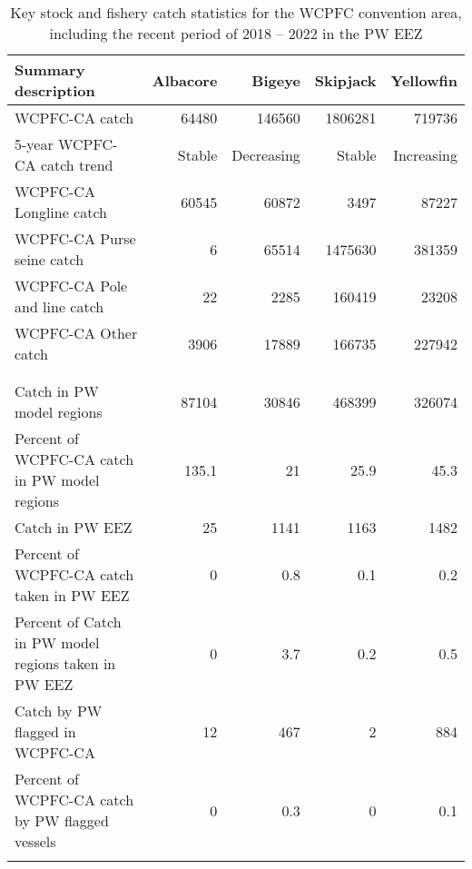 \begin{longtable}{lrrrr}
\caption{Key stock and fishery catch statistics for the WCPFC convention area, including the recent period of 2018 -- 2022 in the PW EEZ} \\ 
  \hline
Summary description & Albacore & Bigeye & Skipjack & Yellowfin \\ 
  \hline
WCPFC-CA catch & 64480 & 146560 & 1806281 & 719736 \\ 
  5-year WCPFC-CA catch trend & Stable & Decreasing & Stable & Increasing \\ 
  WCPFC-CA Longline catch & 60545 & 60872 & 3497 & 87227 \\ 
  WCPFC-CA Purse seine catch & 6 & 65514 & 1475630 & 381359 \\ 
  WCPFC-CA Pole and line catch & 22 & 2285 & 160419 & 23208 \\ 
  WCPFC-CA Other catch & 3906 & 17889 & 166735 & 227942 \\ 
   &  &  &  &  \\ 
   &  &  &  &  \\ 
   \hline
Catch in PW model regions & 87104 & 30846 & 468399 & 326074 \\ 
  Percent of WCPFC-CA catch in PW model regions & 135.1 & 21 & 25.9 & 45.3 \\ 
  Catch in PW EEZ & 25 & 1141 & 1163 & 1482 \\ 
  Percent of WCPFC-CA catch taken in PW EEZ & 0 & 0.8 & 0.1 & 0.2 \\ 
  Percent of Catch in PW model regions taken in PW EEZ & 0 & 3.7 & 0.2 & 0.5 \\ 
  Catch by PW flagged in WCPFC-CA & 12 & 467 & 2 & 884 \\ 
  Percent of WCPFC-CA catch by PW flagged vessels & 0 & 0.3 & 0 & 0.1 \\ 
  \hline
\label{cat_sum_tab}
\end{longtable}
